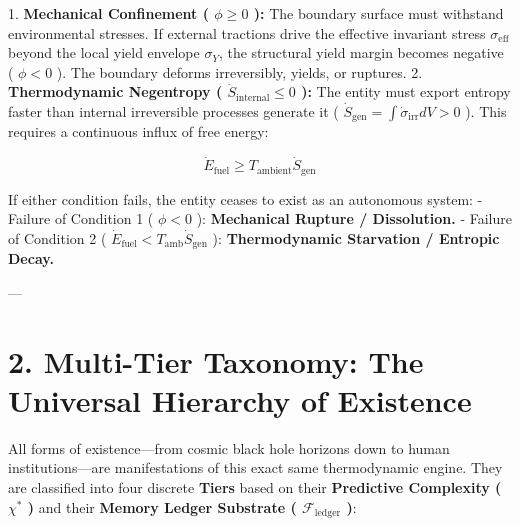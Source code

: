 \documentclass[11pt,a4paper]{article}
\theoremstyle{definition}
\theoremstyle{remark}
\begin{document}
1. \textbf{Mechanical Confinement ( $\phi \ge 0$ ):} The boundary surface must withstand environmental stresses. If external tractions drive the effective invariant stress $\sigma_{\text{eff}}$ beyond the local yield envelope $\sigma_Y$, the structural yield margin becomes negative ( $\phi < 0$ ). The boundary deforms irreversibly, yields, or ruptures.
2. \textbf{Thermodynamic Negentropy ( $\dot{S}_{\text{internal}} \le 0$ ):} The entity must export entropy faster than internal irreversible processes generate it ( $\dot{S}_{\text{gen}} = \int \dot{\sigma}_{\text{irr}} dV > 0$ ). This requires a continuous influx of free energy:


\begin{equation}
\dot{E}_{\text{fuel}} \ge T_{\text{ambient}} \dot{S}_{\text{gen}}
\end{equation}


If either condition fails, the entity ceases to exist as an autonomous system:
- Failure of Condition 1 ( $\phi < 0$ ): \textbf{Mechanical Rupture / Dissolution.}
- Failure of Condition 2 ( $\dot{E}_{\text{fuel}} < T_{\text{amb}} \dot{S}_{\text{gen}}$ ): \textbf{Thermodynamic Starvation / Entropic Decay.}

---

\section{2. Multi-Tier Taxonomy: The Universal Hierarchy of Existence}

All forms of existence—from cosmic black hole horizons down to human institutions—are manifestations of this exact same thermodynamic engine. They are classified into four discrete \textbf{Tiers} based on their \textbf{Predictive Complexity ( $\chi^*$ )} and their \textbf{Memory Ledger Substrate ( $\mathcal{F}_{\text{ledger}}$ )}:
\end{document}
